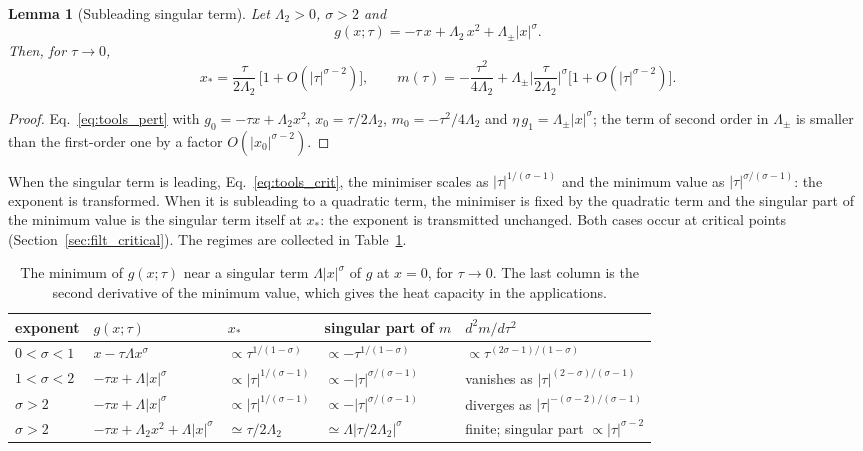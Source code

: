 \documentclass[10pt,a4paper]{article}
\theoremstyle{plain}
\newtheorem{lemma}{Lemma}
\begin{document}
\begin{lemma}[Subleading singular term]\label{lem:sublead}
Let $\Lambda_2>0$, $\sigma>2$ and
\begin{equation}\label{eq:tools_gsub}
  g(x;\tau)=-\tau\,x+\Lambda_2\,x^{2}+\Lambda_\pm|x|^{\sigma} .
\end{equation}
Then, for $\tau\to0$,
\begin{equation}\label{eq:tools_msub}
  x_*=\frac{\tau}{2\Lambda_2}\,\big[1+O(|\tau|^{\sigma-2})\big] ,\qquad
  m(\tau)=-\frac{\tau^{2}}{4\Lambda_2}
  +\Lambda_\pm\Big|\frac{\tau}{2\Lambda_2}\Big|^{\sigma}\big[1+O(|\tau|^{\sigma-2})\big] .
\end{equation}
\end{lemma}
\begin{proof}
Eq.~\eqref{eq:tools_pert} with $g_0=-\tau x+\Lambda_2x^{2}$,
$x_0=\tau/2\Lambda_2$, $m_0=-\tau^{2}/4\Lambda_2$ and
$\eta\,g_1=\Lambda_\pm|x|^{\sigma}$; the term of second order in
$\Lambda_\pm$ is smaller than the first-order one by a factor
$O(|x_0|^{\sigma-2})$.
\end{proof}
When the singular term is leading, Eq.~\eqref{eq:tools_crit}, the minimiser
scales as $|\tau|^{1/(\sigma-1)}$ and the minimum value as
$|\tau|^{\sigma/(\sigma-1)}$: the exponent is transformed. When it is
subleading to a quadratic term, the minimiser is fixed by the quadratic
term and the singular part of the minimum value is the singular term itself
at $x_*$: the exponent is transmitted unchanged. Both cases occur at
critical points (Section~\ref{sec:filt_critical}). The regimes are collected
in Table~\ref{tab:tools_regimes}.
\begin{table}[htbp]
\centering
\small
\caption{The minimum of $g(x;\tau)$ near a singular term
$\Lambda|x|^{\sigma}$ of $g$ at $x=0$, for $\tau\to0$. The last column is the
second derivative of the minimum value, which gives the heat capacity in the
applications.}
\label{tab:tools_regimes}
\begin{tabular}{lllll}
\toprule
exponent & $g(x;\tau)$ & $x_*$ & singular part of $m$ & $d^{2}m/d\tau^{2}$ \\
\midrule
$0<\sigma<1$ & $x-\tau\Lambda x^{\sigma}$ & $\propto\tau^{1/(1-\sigma)}$ & $\propto-\tau^{1/(1-\sigma)}$ & $\propto\tau^{(2\sigma-1)/(1-\sigma)}$ \\[2pt]
$1<\sigma<2$ & $-\tau x+\Lambda|x|^{\sigma}$ & $\propto|\tau|^{1/(\sigma-1)}$ & $\propto-|\tau|^{\sigma/(\sigma-1)}$ & vanishes as $|\tau|^{(2-\sigma)/(\sigma-1)}$ \\[2pt]
$\sigma>2$ & $-\tau x+\Lambda|x|^{\sigma}$ & $\propto|\tau|^{1/(\sigma-1)}$ & $\propto-|\tau|^{\sigma/(\sigma-1)}$ & diverges as $|\tau|^{-(\sigma-2)/(\sigma-1)}$ \\[2pt]
$\sigma>2$ & $-\tau x+\Lambda_2x^{2}+\Lambda|x|^{\sigma}$ & $\simeq\tau/2\Lambda_2$ & $\simeq\Lambda|\tau/2\Lambda_2|^{\sigma}$ & finite; singular part $\propto|\tau|^{\sigma-2}$ \\
\bottomrule
\end{tabular}
\end{table}
\end{document}

